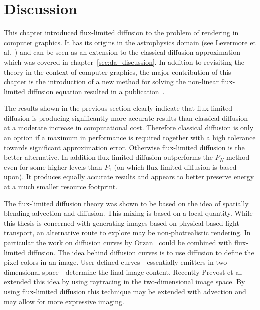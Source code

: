 \section{Discussion}
\label{sec:fld_discussion}

This chapter introduced flux-limited diffusion to the problem of rendering in computer graphics. It has its origins in the astrophysics domain (see Levermore et al.~\cite{Levermore81}) and can be seen as an extension to the classical diffusion approximation which was covered in chapter~\ref{sec:da_discussion}. In addition to revisiting the theory in the context of computer graphics, the major contribution of this chapter is the introduction of a new method for solving the non-linear flux-limited diffusion equation resulted in a publication~\cite{Koerner14}.

The results shown in the previous section clearly indicate that flux-limited diffusion is producing significantly more accurate results than classical diffusion at a moderate increase in computational cost. Therefore classical diffusion is only an option if a maximum in performance is required together with a high tolerance towards significant approximation error. Otherwise flux-limited diffusion is the better alternative. In addition flux-limited diffusion outperforms the $P_N$-method even for some higher levels than $P_1$ (on which flux-limited diffusion is based upon). It produces equally accurate results and appears to better preserve energy at a much smaller resource footprint.

The flux-limited diffusion theory was shown to be based on the idea of spatially blending advection and diffusion. This mixing is based on a local quantity. While this thesis is concerned with generating images based on physical based light transport, an alternative route to explore may be non-photrealistic rendering. In particular the work on diffusion curves by Orzan~\cite{Orzan08} could be combined with flux-limited diffusion. The idea behind diffusion curves is to use diffusion to define the pixel colors in an image. User-defined curves---essentially emitters in two-dimensional space---determine the final image content. Recently Prevost et al.~\cite{Prevost15} extended this idea by using raytracing in the two-dimensional image space. By using flux-limited diffusion this technique may be extended with advection and may allow for more expressive imaging.

